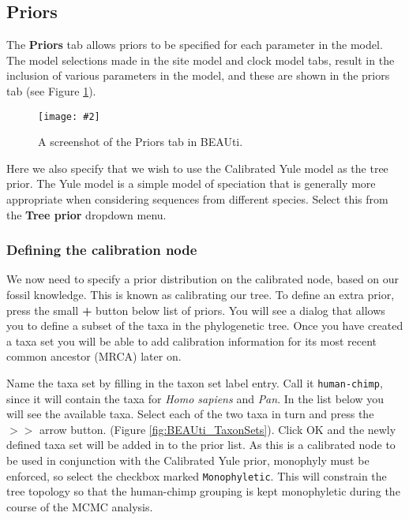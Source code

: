 \documentclass[11pt]{article}
\theoremstyle{plain}%
\theoremstyle{definition}
\theoremstyle{remark}
\newcommand{\includeimage}[2][]{%
\texttt{[image: \#2]}
}
\begin{document}
\subsection{Priors }

The {\bf Priors} tab allows priors to be specified for each parameter in the
model. The model selections made in the site model and clock model tabs, result in the inclusion of various parameters
in the model, and these are shown in the priors tab (see Figure \ref{fig:BEAUti_Prior1}).

\begin{figure}
\centering
\includeimage[width=\textwidth]{figures/BEAUti_Prior1}
\label{fig:BEAUti_Prior1}
\caption{A screenshot of the Priors tab in BEAUti. }
\end{figure}

Here we also specify that we wish to use the Calibrated Yule model \cite{Heled:2012fk}
as the tree prior. The Yule model is a simple model of
speciation that is generally more appropriate when considering sequences from
different species. %
Select this from the {\bf Tree prior} dropdown menu.


\subsubsection{Defining the calibration node}

We now need to specify a prior distribution on the calibrated node, based on our
fossil knowledge. This is known as calibrating our tree. To define an extra prior, press the small {\bf +} button below list of priors. You will see a
dialog that allows you to define a subset of the taxa in the phylogenetic tree. Once you have created a taxa set you will be able to add calibration information for its most recent common
ancestor (MRCA) later on. 

Name the taxa set by filling in the taxon set label entry. 
Call it \texttt{human-chimp}, since it will contain the taxa for {\it Homo sapiens} and {\it Pan}. 
In the list below you will see the available taxa. Select each of the two taxa in turn and press the $> >$ arrow button. (Figure \ref{fig:BEAUti_TaxonSets}).
Click OK and the newly defined taxa set will be added in to the prior list.
As this is a calibrated node to be used in conjunction with the Calibrated Yule prior, monophyly must be enforced, so select the checkbox marked \texttt{Monophyletic}. This will constrain the tree topology so that the human-chimp grouping is kept monophyletic during the course of the MCMC analysis.
\end{document}
